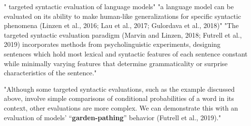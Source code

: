
" targeted syntactic evaluation of language models" \citep{marvin2018targeted}
"a language model can be evaluated on its ability to make human-like generalizations for specific syntactic phenomena (Linzen et al., 2016; Lau et al., 2017; Gulordava et al., 2018)"  \citep{hu2020systematic}
"The targeted syntactic evaluation paradigm (Marvin and Linzen, 2018; Futrell et al., 2019) incorporates methods from psycholinguistic experiments,
designing sentences which hold most lexical and syntactic features of each sentence constant while minimally varying features that determine grammaticality or surprise characteristics of the sentence."  \citep{hu2020systematic}


"Although some targeted syntactic evaluations, such as the example discussed above, involve simple comparisons of conditional probabilities of a word in its context, other evaluations are more complex. We can demonstrate this with an evaluation of models’ “\textbf{garden-pathing}” behavior (Futrell et al., 2019)." \citep{hu2020systematic}




